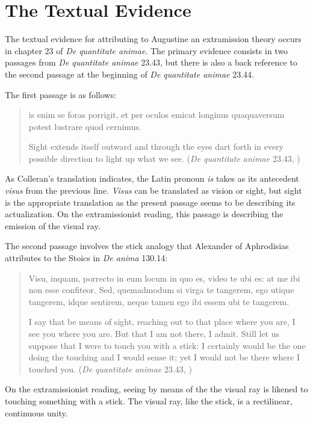 \documentclass[12pt]{article}
\begin{document}

\section{The Textual Evidence} %
\label{sec:the_textual_evidence}

The textual evidence for attributing to Augustine an extramission theory occurs in chapter 23 of \emph{De quantitate animae}. The primary evidence consists in two passages from \emph{De quantitate animae} 23.43, but there is also a back reference to the second passage at the beginning of \emph{De quantitate animae} 23.44.

The first passage is as follows:
\begin{quote}
	is enim se foras porrigit, et per oculos emicat longinus quaquaversum potest lustrare quod cernimus. 
	
	Sight extends itself outward and through the eyes dart forth in every possible direction to light up what we see. (\emph{De quantitate animae} 23.43, \citealt[66]{Colleran:1949ys})
\end{quote}
As Colleran's translation indicates, the Latin pronoun \emph{is} takes as its antecedent \emph{visus} from the previous line. \emph{Visus} can be translated as vision or sight, but sight is the appropriate translation as the present passage seems to be describing its actualization. On the extramissionist reading, this passage is describing the emission of the visual ray.

The second passage involves the stick analogy that Alexander of Aphrodisias attributes to the Stoics in \emph{De anima} 130.14:
\begin{quote}
	Visu, inquam, porrecto in eum locum in quo es, video te ubi es: at me ibi non esse confiteor. Sed, quemadmodum si virga te tangerem, ego utique tangerem, idque sentirem, neque tamen ego ibi essem ubi te tangerem. 
	
	I say that be means of sight, reaching out to that place where you are, I see you where you are. But that I am not there, I admit. Still let us suppose that I were to touch you with a stick: I certainly would be the one doing the touching and I would sense it; yet I would not be there where I touched you. (\emph{De quantitate animae} 23.43, \citealt[66]{Colleran:1949ys}) 
\end{quote}
On the extramissionist reading, seeing by means of the the visual ray is likened to touching something with a stick. The visual ray, like the stick, is a rectilinear, continuous unity.
\end{document}
